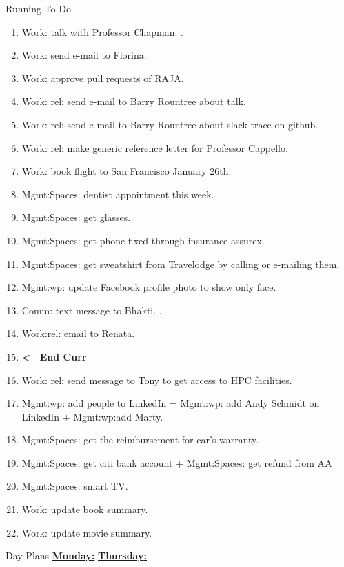 

\begin{frame}[allowframebreaks]{Running To Do}
\begin{enumerate}

\item \tiny Work: talk with Professor Chapman. .
\item \tiny Work: send e-mail to Florina. 
\item \tiny Work: approve pull requests of RAJA. 
\item \tiny Work: rel: send e-mail to Barry Rountree about talk. 
\item \tiny Work: rel: send e-mail to Barry Rountree about slack-trace on github. 
\item \tiny Work: rel: make generic reference letter for Professor Cappello. 
\item \tiny Work: book flight to San Francisco January 26th. 
\item \tiny Mgmt:Spaces: dentist appointment this week. 
\item \tiny Mgmt:Spaces: get glasses. 
\item \tiny Mgmt:Spaces: get phone fixed through insurance assurex. 
\item \tiny Mgmt:Spaces: get sweatshirt from Travelodge by calling or e-mailing them. 
\item \tiny Mgmt:wp: update Facebook profile photo to show only face. 
\item \tiny Comm: text message to Bhakti. .
\item \tiny Work:rel: email to Renata. 
  
\item \tiny \textbf{ <-- End Curr }
  
\item \tiny Work: rel: send message to Tony to get access to HPC facilities. 
\item \tiny Mgmt:wp: add people to LinkedIn =  Mgmt:wp: add Andy Schmidt on LinkedIn +  Mgmt:wp:add Marty. 
\item \tiny Mgmt:Spaces: get the reimbursement for car's warranty. 
\item \tiny Mgmt:Spaces: get citi bank account + Mgmt:Spaces: get refund from AA
\item \tiny Mgmt:Spaces: smart TV. 
\item \tiny Work: update book summary.  
\item \tiny Work: update movie summary. 
\end{enumerate}
\end{frame}


\begin{frame}{Day Plans}
  \underline{\bf{Monday}:}
  \underline{\bf{Thursday}:}
\end{frame} 
